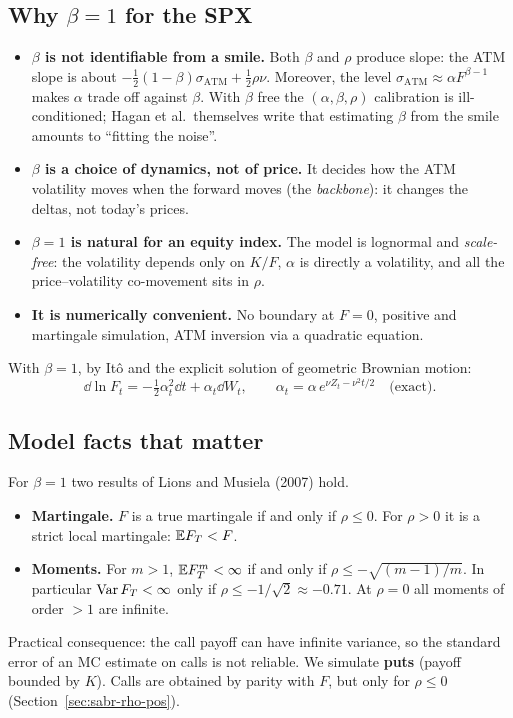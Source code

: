 \subsection{\texorpdfstring{Why $\beta=1$ for the SPX}{Why β=1 for the SPX}}
\begin{perche}
\begin{itemize}
\item \textbf{$\beta$ is not identifiable from a smile.} Both $\beta$ and $\rho$ produce slope: the ATM slope is
about $-\tfrac12(1-\beta)\sigma_{\mathrm{ATM}}+\tfrac12\rho\nu$. Moreover, the level
$\sigma_{\mathrm{ATM}}\approx\alpha F^{\beta-1}$ makes $\alpha$ trade off against $\beta$. With $\beta$ free the
$(\alpha,\beta,\rho)$ calibration is ill-conditioned; Hagan et al.\ themselves write that estimating $\beta$ from the
smile amounts to ``fitting the noise''.
\item \textbf{$\beta$ is a choice of dynamics, not of price.} It decides how the ATM volatility moves when the forward
moves (the \emph{backbone}): it changes the deltas, not today's prices.
\item \textbf{$\beta=1$ is natural for an equity index.} The model is lognormal and \emph{scale-free}: the volatility
depends only on $K/F$, $\alpha$ is directly a volatility, and all the price--volatility co-movement sits in $\rho$.
\item \textbf{It is numerically convenient.} No boundary at $F=0$, positive and martingale simulation, ATM inversion
via a quadratic equation.
\end{itemize}
\end{perche}

With $\beta=1$, by Itô and the explicit solution of geometric Brownian motion:
\begin{equation}\label{eq:sabr-beta1}
\dd\ln F_t=-\tfrac12\alpha_t^2\dd t+\alpha_t\dd W_t,\qquad \alpha_t=\alpha\,e^{\nu Z_t-\nu^2t/2}\quad\text{(exact)}.
\end{equation}

\subsection{Model facts that matter}
For $\beta=1$ two results of Lions and Musiela (2007) hold.
\begin{itemize}
\item \textbf{Martingale.} $F$ is a true martingale if and only if $\rho\le0$. For $\rho>0$ it is a strict local
martingale: $\mathbb{E} F_T<F$.
\item \textbf{Moments.} For $m>1$, $\mathbb{E} F_T^m<\infty$ if and only if $\rho\le-\sqrt{(m-1)/m}$. In particular
$\operatorname{Var} F_T<\infty$ only if $\rho\le-1/\sqrt2\approx-0.71$. At $\rho=0$ all moments of order $>1$ are infinite.
\end{itemize}
\begin{attenzione}
Practical consequence: the call payoff can have infinite variance, so the standard error of an MC estimate on calls is
not reliable. We simulate \textbf{puts} (payoff bounded by $K$). Calls are obtained by parity with $F$, but only for
$\rho\le0$ (Section~\ref{sec:sabr-rho-pos}).
\end{attenzione}

